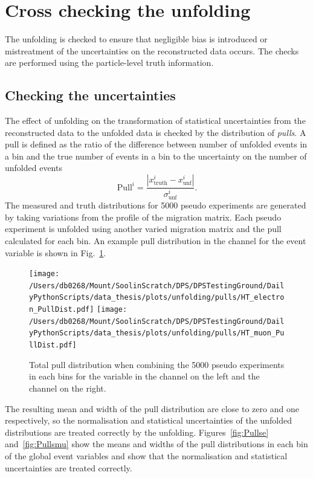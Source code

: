 \section{Cross checking the unfolding} %
\label{sec:cross_checking_the_unfolding}

The unfolding is checked to ensure that negligible bias is introduced or mistreatment of the uncertainties on the reconstructed data occurs. 
The checks are performed using the particle-level truth information.

\subsection{Checking the uncertainties} %
\label{sub:checking_the_uncertainties}

The effect of unfolding on the transformation of statistical uncertainties from the reconstructed data to the unfolded data is checked by the distribution of \textit{pulls}.
A pull is defined as the ratio of the difference between number of unfolded events in a bin and the true number of events in a bin to the uncertainty on the number of unfolded events
\begin{equation*}
\mathrm{Pull}^{i}=\frac{|x^{i}_{\mathrm{truth}}-x^{i}_{\mathrm{unf}}|}{\sigma^{i}_{\mathrm{unf}}}.
\end{equation*}
The measured and truth distributions for 5000 pseudo experiments are generated by taking variations from the profile of the \powhegpythia{} migration matrix.
Each pseudo experiment is unfolded using another varied migration matrix and the pull calculated for each bin.
An example pull distribution in the \eJets{} channel for the \HT{} event variable is shown in Fig.~\ref{fig:pullExample}.
\begin{figure}[htpb]
	\centering
	\texttt{[image: /Users/db0268/Mount/SoolinScratch/DPS/DPSTestingGround/DailyPythonScripts/data\_thesis/plots/unfolding/pulls/HT\_electron\_PullDist.pdf]}
	\texttt{[image: /Users/db0268/Mount/SoolinScratch/DPS/DPSTestingGround/DailyPythonScripts/data\_thesis/plots/unfolding/pulls/HT\_muon\_PullDist.pdf]}
	\caption[Total pull distribution when combining the 5000 pseudo experiments in each bins for the \HT{} variable in the \eJets{} channel on the left and the \muJets{} channel on the right.]{Total pull distribution when combining the 5000 pseudo experiments in each bins for the \HT{} variable in the \eJets{} channel on the left and the \muJets{} channel on the right.}
	\label{fig:pullExample}
\end{figure}
The resulting mean and width of the pull distribution are close to zero and one respectively, so the normalisation and statistical uncertainties of the unfolded distributions are treated correctly by the unfolding.
Figures~\ref{fig:Pullse} and~\ref{fig:Pullsmu} show the means and widths of the pull distributions in each bin of the global event variables and show that the normalisation and statistical uncertainties are treated correctly.




